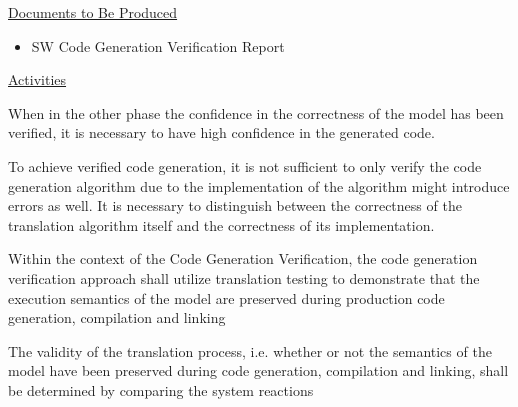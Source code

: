 \underline{Documents to Be Produced} 

\begin{itemize}
\item SW Code Generation Verification Report
\end{itemize}

\underline{Activities}

When in the other phase the confidence in the correctness of the model
has been verified, it is necessary to have high confidence in the
generated code.

To achieve verified code generation, it is not sufficient to only
verify the code generation algorithm due to the implementation of the
algorithm might introduce errors as well. It is necessary to
distinguish between the correctness of the translation algorithm
itself and the correctness of its implementation.

Within the context of the Code Generation Verification, the code
generation verification approach shall utilize translation testing to
demonstrate that the execution semantics of the model are preserved
during production code generation, compilation and linking

The validity of the translation process, i.e. whether or not the
semantics of the model have been preserved during code generation,
compilation and linking, shall be determined by comparing the system
reactions


